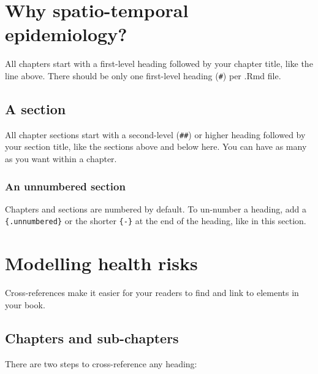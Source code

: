\documentclass[
]{book}
\begin{document}
\hypertarget{why}{%
\chapter{Why spatio-temporal epidemiology?}\label{why}}

All chapters start with a first-level heading followed by your chapter title, like the line above. There should be only one first-level heading (\texttt{\#}) per .Rmd file.

\hypertarget{a-section}{%
\section{A section}\label{a-section}}

All chapter sections start with a second-level (\texttt{\#\#}) or higher heading followed by your section title, like the sections above and below here. You can have as many as you want within a chapter.

\hypertarget{an-unnumbered-section}{%
\subsection*{An unnumbered section}\label{an-unnumbered-section}}

Chapters and sections are numbered by default. To un-number a heading, add a \texttt{\{.unnumbered\}} or the shorter \texttt{\{-\}} at the end of the heading, like in this section.

\hypertarget{health-risks}{%
\chapter{Modelling health risks}\label{health-risks}}

Cross-references make it easier for your readers to find and link to elements in your book.

\hypertarget{chapters-and-sub-chapters}{%
\section{Chapters and sub-chapters}\label{chapters-and-sub-chapters}}

There are two steps to cross-reference any heading:
\end{document}
